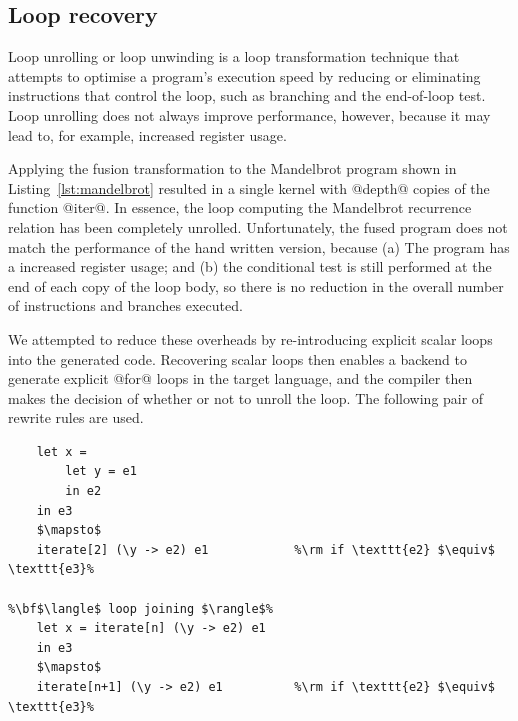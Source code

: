 

\subsection{Loop recovery}
\label{sec:loop_recovery}

Loop unrolling or loop unwinding is a loop transformation technique that
attempts to optimise a program's execution speed by reducing or eliminating
instructions that control the loop, such as branching and the end-of-loop test.
Loop unrolling does not always improve performance, however, because it may lead
to, for example, increased register usage.

Applying the fusion transformation to the Mandelbrot program shown in
Listing~\ref{lst:mandelbrot} resulted in a single kernel with @depth@ copies of
the function @iter@. In essence, the loop computing the Mandelbrot recurrence
relation has been completely unrolled. Unfortunately, the fused program does not
match the performance of the hand written version, because (a)
The program has a increased register usage; and (b) the conditional test is
still performed at the end of each copy of the loop body, so there is no
reduction in the overall number of instructions and branches executed.

We attempted to reduce these overheads by re-introducing explicit scalar loops
into the generated code. Recovering scalar loops then enables a backend to
generate explicit @for@ loops in the target language, and the compiler then
makes the decision of whether or not to unroll the loop. The following pair of
rewrite rules are used.
%
\begin{lstlisting}[style=Haskell,numbers=none,mathescape]
%\bf$\langle$ loop introduction $\rangle$%
    let x =
        let y = e1
        in e2
    in e3
    $\mapsto$
    iterate[2] (\y -> e2) e1            %\rm if \texttt{e2} $\equiv$ \texttt{e3}%

%\bf$\langle$ loop joining $\rangle$%
    let x = iterate[n] (\y -> e2) e1
    in e3
    $\mapsto$
    iterate[n+1] (\y -> e2) e1          %\rm if \texttt{e2} $\equiv$ \texttt{e3}%
\end{lstlisting}

